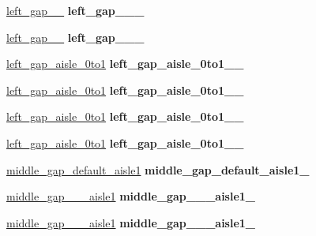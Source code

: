 \begin{DoxyCompactItemize}
\mbox{\label{classGantryControl_afb666797c64f67a0722134521aa8b2ee}} 
\hyperlink{structPresetLocation}{left\+\_\+gap\+\_\+\_} {\bfseries left\+\_\+gap\+\_\+\_\+\_\+}
\item 
\mbox{\label{classGantryControl_a3c6f2b1728f408fc87252aad4417948a}} 
\hyperlink{structPresetLocation}{left\+\_\+gap\+\_\+\_} {\bfseries left\+\_\+gap\+\_\+\_\+\_\+}
\item 
\mbox{\label{classGantryControl_af35d1e9d7d55ece2c567407a5e17c2e3}} 
\hyperlink{structPresetLocation}{left\+\_\+gap\+\_\+aisle\+\_\+0to1} {\bfseries left\+\_\+gap\+\_\+aisle\+\_\+0to1\+\_\+\_\+}
\item 
\mbox{\label{classGantryControl_a8a099954cea2dfd28add05cf43b1b72d}} 
\hyperlink{structPresetLocation}{left\+\_\+gap\+\_\+aisle\+\_\+0to1} {\bfseries left\+\_\+gap\+\_\+aisle\+\_\+0to1\+\_\+\_\+}
\item 
\mbox{\label{classGantryControl_a8011c7a01f46d6199ad9efa5623d5c82}} 
\hyperlink{structPresetLocation}{left\+\_\+gap\+\_\+aisle\+\_\+0to1} {\bfseries left\+\_\+gap\+\_\+aisle\+\_\+0to1\+\_\+\_\+}
\item 
\mbox{\label{classGantryControl_a78a2ec8df7450ac41e070be7b80c6692}} 
\hyperlink{structPresetLocation}{left\+\_\+gap\+\_\+aisle\+\_\+0to1} {\bfseries left\+\_\+gap\+\_\+aisle\+\_\+0to1\+\_\+\_\+}
\item 
\mbox{\label{classGantryControl_a5bcc13b5557234962f076420304e29b3}} 
\hyperlink{structPresetLocation}{middle\+\_\+gap\+\_\+default\+\_\+aisle1} {\bfseries middle\+\_\+gap\+\_\+default\+\_\+aisle1\+\_\+}
\item 
\mbox{\label{classGantryControl_a3b5e80ce4dbb70856b0b5dc3001b42ca}} 
\hyperlink{structPresetLocation}{middle\+\_\+gap\+\_\+\_\+\_\+aisle1} {\bfseries middle\+\_\+gap\+\_\+\_\+\_\+aisle1\+\_\+}
\item 
\mbox{\label{classGantryControl_a51e61326fd6db85c058b3fc517f1bbb0}} 
\hyperlink{structPresetLocation}{middle\+\_\+gap\+\_\+\_\+\_\+aisle1} {\bfseries middle\+\_\+gap\+\_\+\_\+\_\+aisle1\+\_\+}

\end{DoxyCompactItemize}

